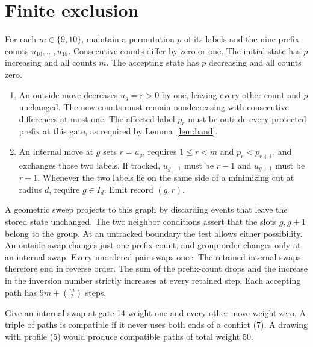 \documentclass[11pt]{article}
\begin{document}
\section{Finite exclusion}\label{sec:finite}
For each \(m\in\{9,10\}\), maintain a permutation \(p\) of its labels and the nine prefix counts \(u_{10},\ldots,u_{18}\). Consecutive counts differ by zero or one. The initial state has \(p\) increasing and all counts \(m\). The accepting state has \(p\) decreasing and all counts zero.

\begin{enumerate}[label=\arabic*.]
\item An outside move decreases \(u_g=r>0\) by one, leaving every other count and \(p\) unchanged. The new counts must remain nondecreasing with consecutive differences at most one. The affected label \(p_r\) must be outside every protected prefix at this gate, as required by Lemma~\ref{lem:band}.
\item An internal move at \(g\) sets \(r=u_g\), requires \(1\le r<m\) and \(p_r<p_{r+1}\), and exchanges those two labels. If tracked, \(u_{g-1}\) must be \(r-1\) and \(u_{g+1}\) must be \(r+1\). Whenever the two labels lie on the same side of a minimizing cut at radius \(d\), require \(g\in I_d\). Emit record \((g,r)\).
\end{enumerate}
A geometric sweep projects to this graph by discarding events that leave the stored state unchanged. The two neighbor conditions assert that the slots \(g,g+1\) belong to the group. At an untracked boundary the test allows either possibility. An outside swap changes just one prefix count, and group order changes only at an internal swap. Every unordered pair swaps once. The retained internal swaps therefore end in reverse order. The sum of the prefix-count drops and the increase in the inversion number strictly increases at every retained step. Each accepting path has \(9m+\binom m2\) steps.

Give an internal swap at gate 14 weight one and every other move weight zero. A triple of paths is compatible if it never uses both ends of a conflict (7). A drawing with profile (5) would produce compatible paths of total weight 50.
\end{document}
